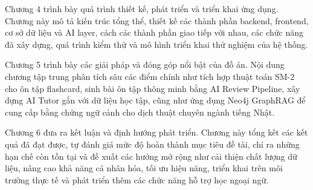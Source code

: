 \documentclass[../DoAn.tex]{subfiles}
\begin{document}
Chương 4 trình bày quá trình thiết kế, phát triển và triển khai ứng dụng. Chương này mô tả kiến trúc tổng thể, thiết kế các thành phần backend, frontend, cơ sở dữ liệu và AI layer, cách các thành phần giao tiếp với nhau, các chức năng đã xây dựng, quá trình kiểm thử và mô hình triển khai thử nghiệm của hệ thống.

Chương 5 trình bày các giải pháp và đóng góp nổi bật của đồ án. Nội dung chương tập trung phân tích sâu các điểm chính như tích hợp thuật toán SM-2 cho ôn tập flashcard, sinh bài ôn tập thông minh bằng AI Review Pipeline, xây dựng AI Tutor gắn với dữ liệu học tập, cũng như ứng dụng Neo4j GraphRAG để cung cấp bằng chứng ngữ cảnh cho dịch thuật chuyên ngành tiếng Nhật.

Chương 6 đưa ra kết luận và định hướng phát triển. Chương này tổng kết các kết quả đã đạt được, tự đánh giá mức độ hoàn thành mục tiêu đề tài, chỉ ra những hạn chế còn tồn tại và đề xuất các hướng mở rộng như cải thiện chất lượng dữ liệu, nâng cao khả năng cá nhân hóa, tối ưu hiệu năng, triển khai trên môi trường thực tế và phát triển thêm các chức năng hỗ trợ học ngoại ngữ.
\end{document}

